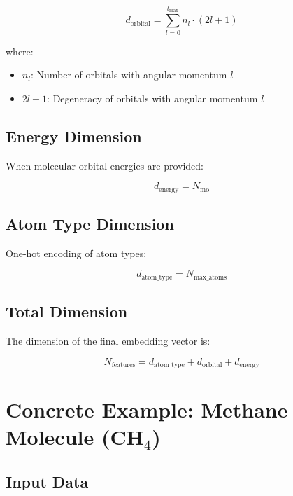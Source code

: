 \documentclass[12pt]{article}
\begin{document}
\begin{equation}
d_{\text{orbital}} = \sum_{l=0}^{l_{\max}} n_l \cdot (2l + 1)
\end{equation}

where:
\begin{itemize}
\item $n_l$: Number of orbitals with angular momentum $l$
\item $2l + 1$: Degeneracy of orbitals with angular momentum $l$
\end{itemize}

\subsection{Energy Dimension}

When molecular orbital energies are provided:

\begin{equation}
d_{\text{energy}} = N_{\text{mo}}
\end{equation}

\subsection{Atom Type Dimension}

One-hot encoding of atom types:

\begin{equation}
d_{\text{atom\_type}} = N_{\text{max\_atoms}}
\end{equation}

\subsection{Total Dimension}

The dimension of the final embedding vector is:

\begin{equation}
N_{\text{features}} = d_{\text{atom\_type}} + d_{\text{orbital}} + d_{\text{energy}}
\end{equation}

\section{Concrete Example: Methane Molecule (CH$_4$)}

\subsection{Input Data}
\end{document}

